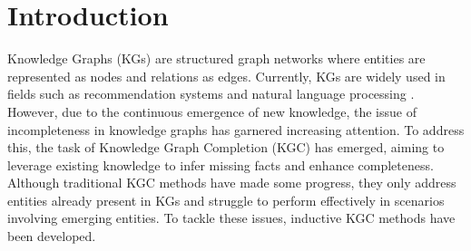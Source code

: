 \documentclass[sigconf]{acmart}
\begin{document}
\section{Introduction}
Knowledge Graphs (KGs) are structured graph networks where entities are represented as nodes and relations as edges. Currently, KGs are widely used in fields such as recommendation systems \cite{wei2022contrastive} and natural language processing \cite{wang2023survey}. However, due to the continuous emergence of new knowledge, the issue of incompleteness in knowledge graphs has garnered increasing attention. To address this, the task of Knowledge Graph Completion (KGC) \cite{wang2023multi} has emerged, aiming to leverage existing knowledge to infer missing facts and enhance completeness. Although traditional KGC methods \cite{10115028, ho2018rule, wang2022multi} have made some progress, they only address entities already present in KGs and struggle to perform effectively in scenarios involving emerging entities. To tackle these issues, inductive KGC methods \cite{teru2020inductive, chen2021topology, zhu2021neural, zhang2021knowledge} have been developed. %


\end{document}
